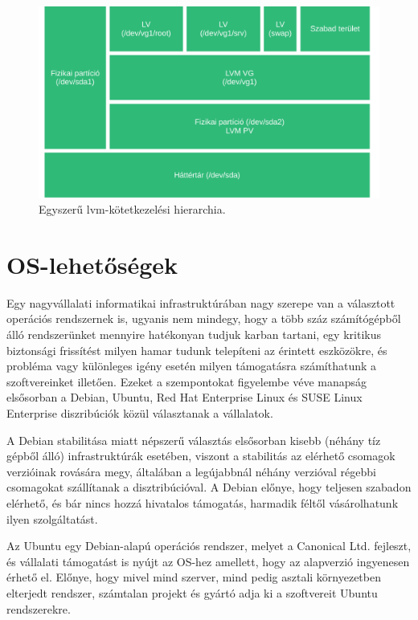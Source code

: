 \begin{figure}[!ht]
	\centering
	\includegraphics[width=14cm]{figures/lvm.pdf}
	\caption{Egyszerű \acrshort{lvm}-kötetkezelési hierarchia.}
	\label{fig:lvm}
\end{figure}

\section{OS-lehetőségek} \label{sect:os}
Egy nagyvállalati informatikai infrastruktúrában nagy szerepe van a választott operációs rendszernek is, ugyanis nem mindegy, hogy a több száz számítógépből álló rendszerünket mennyire hatékonyan tudjuk karban tartani, egy kritikus biztonsági frissítést milyen hamar tudunk telepíteni az érintett eszközökre, és probléma vagy különleges igény esetén milyen támogatásra számíthatunk a szoftvereinket illetően.
Ezeket a szempontokat figyelembe véve manapság elsősorban a Debian, Ubuntu, Red Hat Enterprise Linux és SUSE Linux Enterprise diszribúciók közül választanak a vállalatok.

A Debian stabilitása miatt népszerű választás elsősorban kisebb (néhány tíz gépből álló) infrastruktúrák esetében, viszont a stabilitás az elérhető csomagok verzióinak rovására megy, általában a legújabbnál néhány verzióval régebbi csomagokat szállítanak a disztribúcióval. A Debian előnye, hogy teljesen szabadon elérhető, és bár nincs hozzá hivatalos támogatás, harmadik féltől vásárolhatunk ilyen szolgáltatást.

Az Ubuntu egy Debian-alapú operációs rendszer, melyet a Canonical Ltd. fejleszt, és vállalati támogatást is nyújt az OS-hez amellett, hogy az alapverzió ingyenesen érhető el. Előnye, hogy mivel mind szerver, mind pedig asztali környezetben elterjedt rendszer, számtalan projekt és gyártó adja ki a szoftvereit Ubuntu rendszerekre.

